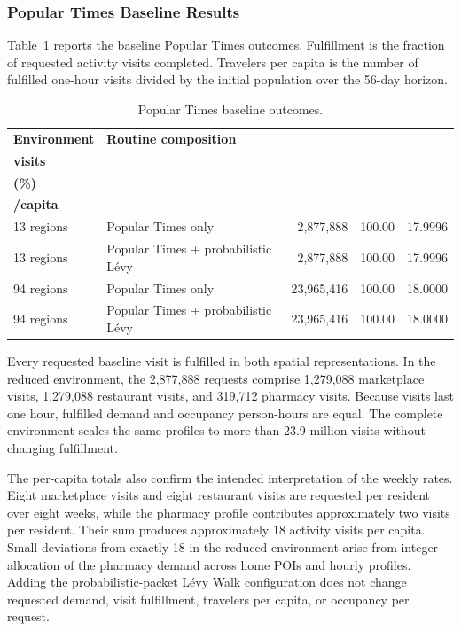 \subsubsection{Popular Times Baseline Results}

Table~\ref{tbl:popular_times_baseline} reports the baseline Popular Times outcomes. Fulfillment is the fraction of requested activity visits completed. Travelers per capita is the number of fulfilled one-hour visits divided by the initial population over the 56-day horizon.


\begin{table}[ht]
\centering
\caption{Popular Times baseline outcomes.}
\label{tbl:popular_times_baseline}
\begin{tabularx}{\linewidth}{@{}llrrr@{}}
\toprule
\textbf{Environment} &
\textbf{Routine composition} &
\shortstack{\textbf{Requested}\\\textbf{visits}} &
\shortstack{\textbf{Fulfillment}\\\textbf{(\%)}} &
\shortstack{\textbf{Travelers}\\\textbf{/capita}} \\
\midrule
13 regions & Popular Times only
    & 2,877,888 & 100.00 & 17.9996 \\
13 regions & Popular Times + probabilistic L\'evy
    & 2,877,888 & 100.00 & 17.9996 \\
94 regions & Popular Times only
    & 23,965,416 & 100.00 & 18.0000 \\
94 regions & Popular Times + probabilistic L\'evy
    & 23,965,416 & 100.00 & 18.0000 \\
\bottomrule
\end{tabularx}
\end{table}

Every requested baseline visit is fulfilled in both spatial representations. In the reduced environment, the 2,877,888 requests comprise 1,279,088 marketplace visits, 1,279,088 restaurant visits, and 319,712 pharmacy visits. Because visits last one hour, fulfilled demand and occupancy person-hours are equal. The complete environment scales the same profiles to more than 23.9 million visits without changing fulfillment.

The per-capita totals also confirm the intended interpretation of the weekly rates. Eight marketplace visits and eight restaurant visits are requested per resident over eight weeks, while the pharmacy profile contributes approximately two visits per resident. Their sum produces approximately 18 activity visits per capita. 
Small deviations from exactly 18 in the reduced environment arise from integer allocation of the pharmacy demand across home POIs and hourly profiles. 
Adding the probabilistic-packet L\'evy Walk configuration does not change requested demand, visit fulfillment, travelers per capita, or occupancy per request.


